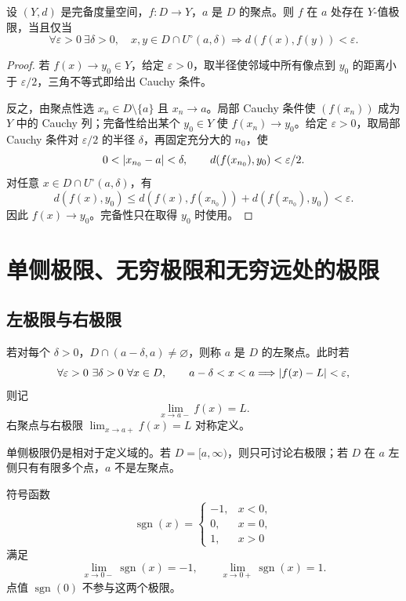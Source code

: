 \begin{theorem}[完备值域版本]
设 \((Y,d)\) 是完备度量空间，\(f:D\to Y\)，\(a\) 是 \(D\) 的聚点。则 \(f\) 在 \(a\) 处存在 \(Y\)-值极限，当且仅当
\[
 \forall\varepsilon>0\ \exists\delta>0,\quad
 x,y\in D\cap U^\circ(a,\delta)
 \Longrightarrow d(f(x),f(y))<\varepsilon.
\]
\end{theorem}

\begin{proof}
若 \(f(x)\to y_0\in Y\)，给定 \(\varepsilon>0\)，取半径使邻域中所有像点到 \(y_0\) 的距离小于 \(\varepsilon/2\)，三角不等式即给出 Cauchy 条件。

反之，由聚点性选 \(x_n\in D\setminus\{a\}\) 且 \(x_n\to a\)。局部 Cauchy 条件使 \((f(x_n))\) 成为 \(Y\) 中的 Cauchy 列；完备性给出某个 \(y_0\in Y\) 使 \(f(x_n)\to y_0\)。给定 \(\varepsilon>0\)，取局部 Cauchy 条件对 \(\varepsilon/2\) 的半径 \(\delta\)，再固定充分大的 \(n_0\)，使
\[
 0<\left|x_{n_0}-a\right|<\delta,
 \qquad d(f(x_{n_0}),y_0)<\varepsilon/2.
\]
对任意 \(x\in D\cap U^\circ(a,\delta)\)，有
\[
 d(f(x),y_0)
 \le d(f(x),f(x_{n_0}))+d(f(x_{n_0}),y_0)<\varepsilon.
\]
因此 \(f(x)\to y_0\)。完备性只在取得 \(y_0\) 时使用。
\end{proof}

\section{单侧极限、无穷极限和无穷远处的极限}

\subsection{左极限与右极限}

\begin{definition}[单侧聚点与单侧极限]
若对每个 \(\delta>0\)，\(D\cap(a-\delta,a)\ne\varnothing\)，则称 \(a\) 是 \(D\) 的左聚点。此时若
\[
 \forall\varepsilon>0\ \exists\delta>0\ \forall x\in D,\qquad
 a-\delta<x<a\Longrightarrow\abs{f(x)-L}<\varepsilon,
\]
则记
\[
 \lim_{x\to a-}f(x)=L.
\]
右聚点与右极限 \(\lim_{x\to a+}f(x)=L\) 对称定义。
\end{definition}

单侧极限仍是相对于定义域的。若 \(D=[a,\infty)\)，则只可讨论右极限；若 \(D\) 在 \(a\) 左侧只有有限多个点，\(a\) 不是左聚点。

\begin{example}
符号函数
\[
 \operatorname{sgn}(x)=
 \begin{cases}
 -1,&x<0,\\
 0,&x=0,\\
 1,&x>0
 \end{cases}
\]
满足
\[
 \lim_{x\to0-}\operatorname{sgn}(x)=-1,\qquad
 \lim_{x\to0+}\operatorname{sgn}(x)=1.
\]
点值 \(\operatorname{sgn}(0)\) 不参与这两个极限。
\end{example}

